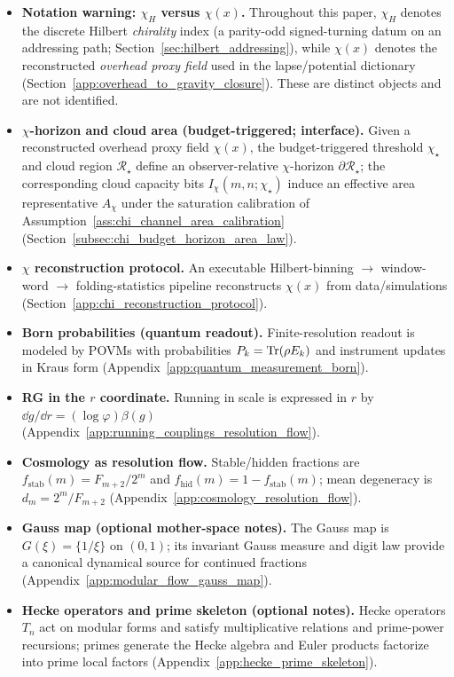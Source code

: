 \begin{itemize}
\item \textbf{Notation warning: $\chi_H$ versus $\chi(x)$.}
Throughout this paper, $\chi_H$ denotes the discrete Hilbert \emph{chirality} index (a parity-odd signed-turning datum on an addressing path; Section~\ref{sec:hilbert_addressing}),
while $\chi(x)$ denotes the reconstructed \emph{overhead proxy field} used in the lapse/potential dictionary (Section~\ref{app:overhead_to_gravity_closure}).
These are distinct objects and are not identified.
\item \textbf{$\chi$-horizon and cloud area (budget-triggered; interface).}
Given a reconstructed overhead proxy field $\chi(x)$, the budget-triggered threshold $\chi_\star$ and cloud region $\mathcal R_\star$ define an observer-relative $\chi$-horizon $\partial\mathcal R_\star$; the corresponding cloud capacity bits $I_\chi(m,n;\chi_\star)$ induce an effective area representative $A_\chi$ under the saturation calibration of Assumption~\ref{ass:chi_channel_area_calibration} (Section~\ref{subsec:chi_budget_horizon_area_law}).
\item \textbf{$\chi$ reconstruction protocol.}
An executable Hilbert-binning $\to$ window-word $\to$ folding-statistics pipeline reconstructs $\chi(x)$ from data/simulations (Section~\ref{app:chi_reconstruction_protocol}).
\item \textbf{Born probabilities (quantum readout).}
Finite-resolution readout is modeled by POVMs with probabilities $P_k=\mathrm{Tr}(\rho E_k)$ and instrument updates in Kraus form (Appendix~\ref{app:quantum_measurement_born}).
\item \textbf{RG in the $r$ coordinate.}
Running in scale is expressed in $r$ by $\dd g/\dd r=(\log\varphi)\beta(g)$ (Appendix~\ref{app:running_couplings_resolution_flow}).
\item \textbf{Cosmology as resolution flow.}
Stable/hidden fractions are $f_{\mathrm{stab}}(m)=F_{m+2}/2^m$ and $f_{\mathrm{hid}}(m)=1-f_{\mathrm{stab}}(m)$; mean degeneracy is $d_m=2^m/F_{m+2}$ (Appendix~\ref{app:cosmology_resolution_flow}).
\item \textbf{Gauss map (optional mother-space notes).}
The Gauss map is $G(\xi)=\{1/\xi\}$ on $(0,1)$; its invariant Gauss measure and digit law provide a canonical dynamical source for continued fractions (Appendix~\ref{app:modular_flow_gauss_map}).
\item \textbf{Hecke operators and prime skeleton (optional notes).}
Hecke operators $T_n$ act on modular forms and satisfy multiplicative relations and prime-power recursions; primes generate the Hecke algebra and Euler products factorize into prime local factors (Appendix~\ref{app:hecke_prime_skeleton}).

\end{itemize}
